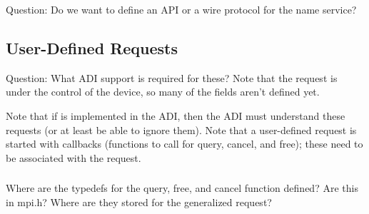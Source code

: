 \documentclass{article}
\begin{document}
\subsubsection{}

\subsubsection{}
Question:  Do we want to define an API or a wire protocol for the name
service?

\subsubsection{}
\subsubsection{}

\subsubsection{}
\subsubsection{}

\subsection{User-Defined Requests}

Question:  What ADI support is required for these?  Note that the
request is under the control of the device, so many of the fields
aren't defined yet.

Note that if  is implemented in the ADI, then the
ADI must understand these requests (or at least be able to ignore
them).
Note that a user-defined request is started with callbacks (functions
to call for query, cancel, and free); these need to be associated with
the request.  

\subsubsection{}
Where are the typedefs for the query, free, and cancel function defined? 
Are this in mpi.h?  Where are they stored for the generalized request?
\end{document}
